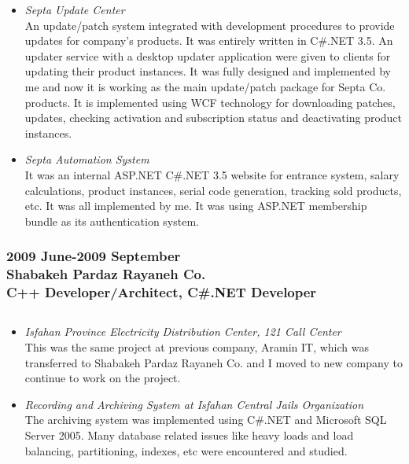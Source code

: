 \documentclass[10pt,a4paper]{article}
\begin{document}
\begin{itemize}
		\item \small \textit{Septa Update Center} \\
			An update/patch system integrated with development procedures to provide updates for company's products. It was entirely written in C\#.NET 3.5. An updater service with a desktop updater application were given to clients for updating their product instances. It was fully designed and implemented by me and now it is working as the main update/patch package for Septa Co. products. It is implemented using WCF technology for downloading patches, updates, checking activation and subscription status and deactivating product instances. \\
		\item \small \textit{Septa Automation System} \\
			It was an internal ASP.NET C\#.NET 3.5 website for entrance system, salary calculations, product instances, serial code generation, tracking sold products, etc. It was all implemented by me. It was using ASP.NET membership bundle as its authentication system.
  \end{itemize}
  \setlength{\leftskip}{0pt}
  \setlength{\rightskip}{0cm}

\subsubsection{\textnormal {2009 June-2009 September} \\ \textnormal {Shabakeh Pardaz Rayaneh Co.} \\ C++ Developer/Architect, C\#.NET Developer}
\subsection{}
  \setlength{\leftskip}{0.5cm}
  \setlength{\rightskip}{1cm}
	\begin{itemize}
	  \setlength{\rightskip}{2cm}
    \setlength\itemsep{0em}
		\item \small \textit{Isfahan Province Electricity Distribution Center, 121 Call Center} \\
		This was the same project at previous company, Aramin IT, which was transferred to Shabakeh Pardaz Rayaneh Co. and I moved to new company to continue to work on the project. \\
		\item \small \textit{Recording and Archiving System at Isfahan Central Jails Organization} \\
		The archiving system was implemented using C\#.NET and Microsoft SQL Server 2005. Many database related issues like heavy loads and load balancing, partitioning, indexes, etc were encountered and studied.
	\end{itemize}
	\setlength{\leftskip}{0pt}
  \setlength{\rightskip}{0cm}
		
\end{document}
